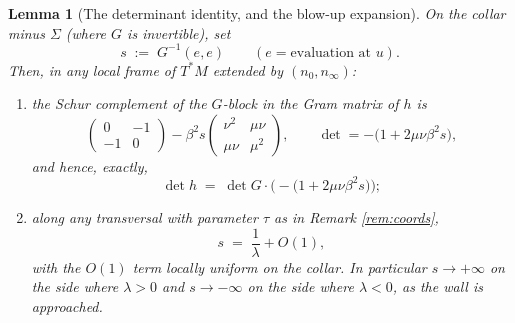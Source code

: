 \documentclass[11pt]{article}
\newtheorem{lemma}[theorem]{Lemma}
\theoremstyle{definition}
\newcommand{\Sig}{\Sigma}
\newcommand{\nO}{n_0}
\newcommand{\nInf}{n_\infty}
\begin{document}
\begin{lemma}[The determinant identity, and the blow-up expansion]\label{lem:det}
On the collar minus $\Sig$ (where $G$ is invertible), set
\[
s \;:=\; G^{-1}(e, e) \qquad (e = \text{evaluation at } u) .
\]
Then, in any local frame of $T^*M$ extended by $(\nO, \nInf)$:
\begin{enumerate}
\item the Schur complement of the $G$-block in the Gram matrix of $h$ is
\[
\begin{pmatrix} 0 & -1 \\ -1 & 0 \end{pmatrix} - \beta^2 s \begin{pmatrix} \nu^2 & \mu\nu \\ \mu\nu & \mu^2 \end{pmatrix},
\qquad \det = -\bigl(1 + 2\mu\nu\beta^2 s\bigr),
\]
and hence, exactly,
\[
\det h \;=\; \det G \cdot \bigl(-\bigl(1 + 2\mu\nu\beta^2 s\bigr)\bigr) ;
\]
\item along any transversal with parameter $\tau$ as in Remark \ref{rem:coords},
\[
s \;=\; \frac{1}{\lambda} + O(1),
\]
with the $O(1)$ term locally uniform on the collar. In particular $s \to +\infty$ on the side where $\lambda > 0$ and $s \to -\infty$ on the side where $\lambda < 0$, as the wall is approached.
\end{enumerate}
\end{lemma}
\end{document}

